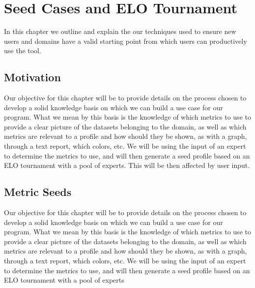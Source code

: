 %
%

\chapter{Seed Cases and ELO Tournament}

\begin{resumen}
In this chapter we outline and explain the our techniques used to ensure new users and domains have a valid starting point from which users can productively use the tool.
\end{resumen}


\section{Motivation}
\label{cap1:sec:motivation}

Our objective for this chapter will be to provide details on the process chosen to develop a solid knowledge basis on which we can build a use case for our program.
What we mean by this basis is the knowledge of which metrics to use to provide a clear picture of the datasets belonging to the domain, as well as which metrics are relevant to a profile and how should they be shown, as with a graph, through a text report, which colors, etc.
We will be using the input of an expert to determine the metrics to use, and will then generate a seed profile based on an ELO tournament with a pool of experts. This will be then affected by user input.

\section{Metric Seeds}
\label{cap1:sec:motivation}

Our objective for this chapter will be to provide details on the process chosen to develop a solid knowledge basis on which we can build a use case for our program.
What we mean by this basis is the knowledge of which metrics to use to provide a clear picture of the datasets belonging to the domain, as well as which metrics are relevant to a profile and how should they be shown, as with a graph, through a text report, which colors, etc.
We will be using the input of an expert to determine the metrics to use, and will then generate a seed profile based on an ELO tournament with a pool of experts

